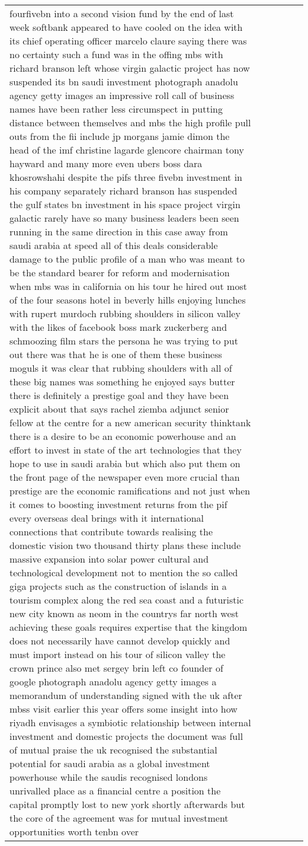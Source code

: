 \documentclass[]{article}
\begin{document}
\begin{table}[!h]
\begin{tabular}[t]{llllll}
fourfivebn into a second vision fund by the end of last week softbank appeared to have cooled on the idea with its chief operating officer marcelo claure saying there was no certainty such a fund was in the offing mbs with richard branson left whose virgin galactic project has now suspended its bn saudi investment photograph anadolu agency getty images an impressive roll call of business names have been rather less circumspect in putting distance between themselves and mbs the high profile pull outs from the fii include jp morgans jamie dimon the head of the imf christine lagarde glencore chairman tony hayward and many more even ubers boss dara khosrowshahi despite the pifs three fivebn investment in his company separately richard branson has suspended the gulf states bn investment in his space project virgin galactic rarely have so many business leaders been seen running in the same direction in this case away from saudi arabia at speed all of this deals considerable damage to the public profile of a man who was meant to be the standard bearer for reform and modernisation when mbs was in california on his tour he hired out most of the four seasons hotel in beverly hills enjoying lunches with rupert murdoch rubbing shoulders in silicon valley with the likes of facebook boss mark zuckerberg and schmoozing film stars the persona he was trying to put out there was that he is one of them these business moguls it was clear that rubbing shoulders with all of these big names was something he enjoyed says butter there is definitely a prestige goal and they have been explicit about that says rachel ziemba adjunct senior fellow at the centre for a new american security thinktank there is a desire to be an economic powerhouse and an effort to invest in state of the art technologies that they hope to use in saudi arabia but which also put them on the front page of the newspaper even more crucial than prestige are the economic ramifications and not just when it comes to boosting investment returns from the pif every overseas deal brings with it international connections that contribute towards realising the domestic vision two thousand thirty plans these include massive expansion into solar power cultural and technological development not to mention the so called giga projects such as the construction of islands in a tourism complex along the red sea coast and a futuristic new city known as neom in the countrys far north west achieving these goals requires expertise that the kingdom does not necessarily have cannot develop quickly and must import instead on his tour of silicon valley the crown prince also met sergey brin left co founder of google photograph anadolu agency getty images a memorandum of understanding signed with the uk after mbss visit earlier this year offers some insight into how riyadh envisages a symbiotic relationship between internal investment and domestic projects the document was full of mutual praise the uk recognised the substantial potential for saudi arabia as a global investment powerhouse while the saudis recognised londons unrivalled place as a financial centre a position the capital promptly lost to new york shortly afterwards but the core of the agreement was for mutual investment opportunities worth tenbn over 
\end{tabular}
\end{table}
\end{document}
